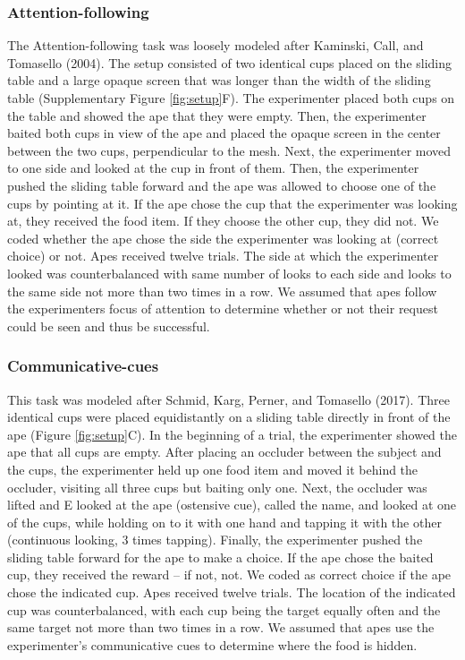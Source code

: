 \documentclass[
  man,floatsintext]{apa6}
\begin{document}
\hypertarget{attention-following}{%
\subsubsection{Attention-following}\label{attention-following}}

The Attention-following task was loosely modeled after Kaminski, Call, and Tomasello (2004). The setup consisted of two identical cups placed on the sliding table and a large opaque screen that was longer than the width of the sliding table (Supplementary Figure \ref{fig:setup}F). The experimenter placed both cups on the table and showed the ape that they were empty. Then, the experimenter baited both cups in view of the ape and placed the opaque screen in the center between the two cups, perpendicular to the mesh. Next, the experimenter moved to one side and looked at the cup in front of them. Then, the experimenter pushed the sliding table forward and the ape was allowed to choose one of the cups by pointing at it. If the ape chose the cup that the experimenter was looking at, they received the food item. If they choose the other cup, they did not. We coded whether the ape chose the side the experimenter was looking at (correct choice) or not. Apes received twelve trials. The side at which the experimenter looked was counterbalanced with same number of looks to each side and looks to the same side not more than two times in a row. We assumed that apes follow the experimenters focus of attention to determine whether or not their request could be seen and thus be successful.

\hypertarget{communicative-cues}{%
\subsubsection{Communicative-cues}\label{communicative-cues}}

This task was modeled after Schmid, Karg, Perner, and Tomasello (2017). Three identical cups were placed equidistantly on a sliding table directly in front of the ape (Figure \ref{fig:setup}C). In the beginning of a trial, the experimenter showed the ape that all cups are empty. After placing an occluder between the subject and the cups, the experimenter held up one food item and moved it behind the occluder, visiting all three cups but baiting only one. Next, the occluder was lifted and E looked at the ape (ostensive cue), called the name, and looked at one of the cups, while holding on to it with one hand and tapping it with the other (continuous looking, 3 times tapping). Finally, the experimenter pushed the sliding table forward for the ape to make a choice. If the ape chose the baited cup, they received the reward -- if not, not. We coded as correct choice if the ape chose the indicated cup. Apes received twelve trials. The location of the indicated cup was counterbalanced, with each cup being the target equally often and the same target not more than two times in a row. We assumed that apes use the experimenter's communicative cues to determine where the food is hidden.
\end{document}
